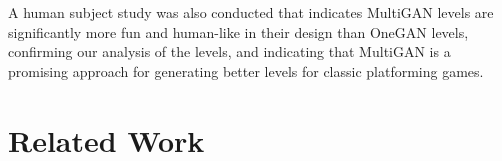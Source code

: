 



A human subject study was also conducted
that indicates MultiGAN levels are significantly more fun and human-like in their design than OneGAN levels, confirming our analysis of the levels, and indicating that MultiGAN is a promising approach for generating better levels for classic platforming games.



\section{Related Work}
\label{sec:related}


